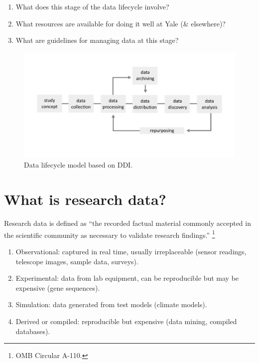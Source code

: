\documentclass{tufte-handout}
\begin{document}
\begin{enumerate}
\def\labelenumi{\arabic{enumi}.}
\itemsep1pt\parskip0pt
\item
  What does this stage of the data lifecycle involve?
\item
  What resources are available for doing it well at Yale (\& elsewhere)?
\item
  What are guidelines for managing data at this stage?
\end{enumerate}


\begin{figure}
  \includegraphics{ddilifecycle.pdf}
  \caption{Data lifecycle model based on DDI.}
  \label{fig:textfig}
\end{figure}

\section{What is research data?}\label{what-is-research-data}

Research data is defined as ``the recorded factual material commonly
accepted in the scientific community as necessary to validate research
findings.'' \footnote {OMB Circular A-110.} 


\begin{enumerate}
\def\labelenumi{\arabic{enumi}.}
\itemsep1pt\parskip0pt
\item
  Observational: captured in real time, usually irreplaceable (sensor readings, telescope images, sample data, surveys).
\item
  Experimental: data from lab equipment, can be reproducible but may be expensive (gene sequences).
\item
  Simulation: data generated from test models (climate models).
\item
  Derived or compiled: reproducible but expensive (data mining, compiled databases).
\end{enumerate}
\end{document}
